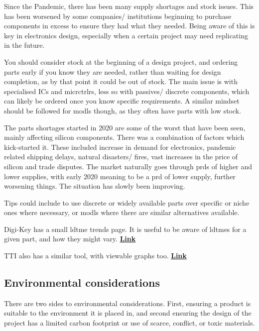 \documentclass[a4paper,11pt]{report}
\let\oldhref\href %
\renewcommand{\href}[2]{\oldhref{#1}{\bfseries#2}}
\begin{document}
Since the Pandemic, there has been many supply shortages and stock issues. This has been worsened by some companies/ institutions beginning to purchase components in excess to ensure they had what they needed. Being aware of this is key in electronics design, especially when a certain project may need replicating in the future.

You should consider stock at the beginning of a design project, and ordering parts early if you know they are needed, rather than waiting for design completion, as by that point it could be out of stock. The main issue is with specialised ICs and \gls{micrctrlr}s, less so with passives/ discrete components, which can likely be ordered once you know specific requirements. A similar mindset should be followed for \gls{modl}s though, as they often have parts with low stock.

The parts shortages started in 2020 are some of the worst that have been seen, mainly affecting silicon components. There was a combination of factors which kick-started it. These included increase in demand for electronics, pandemic related shipping delays, natural disasters/ fires, vast increases in the price of silicon and trade disputes. The market naturally goes through \gls{prd}s of higher and lower supplies, with early 2020 meaning to be a \gls{prd} of lower supply, further worsening things. The situation has slowly been improving.

Tips could include to use discrete or widely available parts over specific or niche ones where necessary, or \gls{modl}s where there are similar alternatives available.

Digi-Key has a small \gls{ldtme} trends page. It is useful to be aware of \gls{ldtme}s for a given part, and how they might vary. \href{https://www.digikey.co.uk/en/resources/reports/lead-time-trends}{Link}

TTI also has a similar tool, with viewable graphs too. \href{https://www.tti.com/content/ttiinc/en/apps/lead-time-trends.html}{Link}

\vspace*{1\baselineskip}

\subsection{Environmental considerations}
There are two sides to environmental considerations. First, ensuring a product is suitable to the environment it is placed in, and second ensuring the design of the project has a limited carbon footprint or use of scarce, conflict, or toxic materials.
\end{document}
